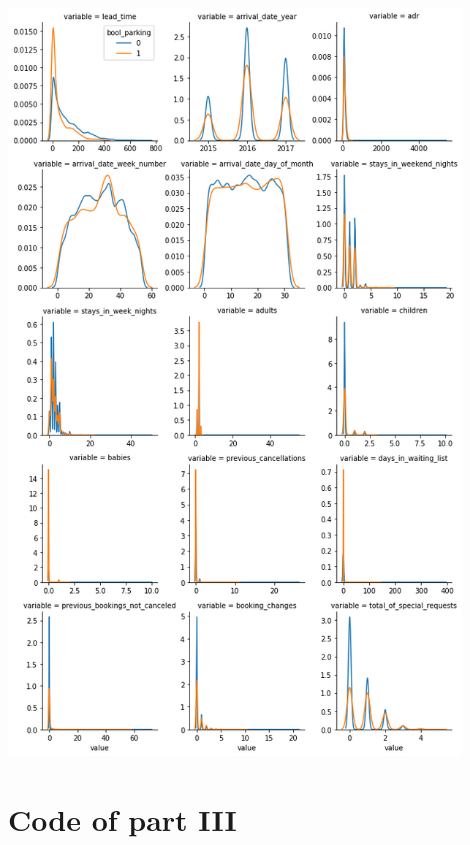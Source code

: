 \documentclass[10pt,a4paper]{article}
\theoremstyle{break}
\begin{document}
\begin{center}
\includegraphics[width=0.9\textwidth]{img/TP2_KA_IB_files/TP2_KA_IB_82_1.png}
\end{center}

\newpage

\hypertarget{annexe:annexe5}{%
\section{Code of part III}\label{annexe:annexe5}}
\end{document}
